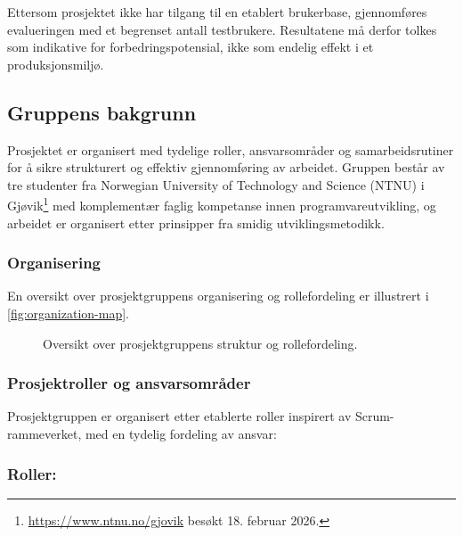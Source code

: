 Ettersom prosjektet ikke har tilgang til en etablert brukerbase, gjennomføres evalueringen med et begrenset antall testbrukere. Resultatene må derfor tolkes som indikative for forbedringspotensial, ikke som endelig effekt i et produksjonsmiljø.

\subsection{Gruppens bakgrunn}

Prosjektet er organisert med tydelige roller, ansvarsområder og samarbeidsrutiner for å sikre strukturert og effektiv gjennomføring av arbeidet. Gruppen består av tre studenter fra 
Norwegian University of Technology and Science (NTNU) i Gjøvik\footnote{\url{https://www.ntnu.no/gjovik} besøkt 18. februar 2026.} med komplementær faglig kompetanse innen programvareutvikling, og arbeidet er organisert etter prinsipper fra smidig utviklingsmetodikk.


\subsubsection{Organisering}

En oversikt over prosjektgruppens organisering og rollefordeling er illustrert i \autoref{fig:organization-map}.

\begin{figure}[H]
    \centering
    
    \caption{Oversikt over prosjektgruppens struktur og rollefordeling.}
    \label{fig:organization-map}
\end{figure}


\subsubsection{Prosjektroller og ansvarsområder}

Prosjektgruppen er organisert etter etablerte roller inspirert av Scrum-rammeverket, med en tydelig fordeling av ansvar:

\subsubsection*{Roller:}

